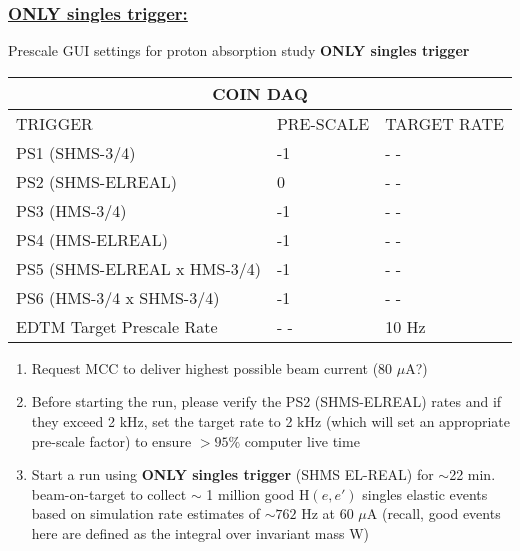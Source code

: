 \documentclass{article}
\begin{document}
\subsubsection*{\underline{ONLY singles trigger:}}
  \begin{center}
    Prescale GUI settings for proton absorption study \textbf{ONLY singles trigger}
    \begin{tabular}{ |p{6cm}| |p{3cm}| |p{3cm}| }
    \hline
    \multicolumn{3}{|c|}{COIN DAQ} \\
    \hline
    TRIGGER & PRE-SCALE & TARGET RATE\\
    \hline
    PS1 (SHMS-3/4)    & -1  & - - \\
    PS2 (SHMS-ELREAL) &  0  & - - \\
    PS3 (HMS-3/4)     & -1  & - -\\
    PS4 (HMS-ELREAL)  & -1  & - - \\
    PS5 (SHMS-ELREAL x HMS-3/4)  & -1 & - -  \\
    PS6 (HMS-3/4 x SHMS-3/4)     & -1 & - -  \\
    \hline
    EDTM Target Prescale Rate & - - & 10 Hz \\
    \hline
    \end{tabular}
    \end{center}
\begin{enumerate}
    \item Request MCC to deliver highest possible beam current (80 $\mu$A?)
    \item Before starting the run, please verify the PS2 (SHMS-ELREAL) rates and if they exceed 2 kHz, set the target rate to 2 kHz (which will set an appropriate pre-scale factor) to ensure $>95\%$ computer live time
    \item Start a run using \textbf{ONLY singles trigger} (SHMS EL-REAL) for $\sim$22 min. beam-on-target to collect $\sim$ 1 million good H$(e,e')$ singles elastic events based on simulation rate estimates of $\sim762$ Hz at 60 $\mu$A (recall, good events here are defined as the integral over invariant mass W)
\end{enumerate}
\end{document}
